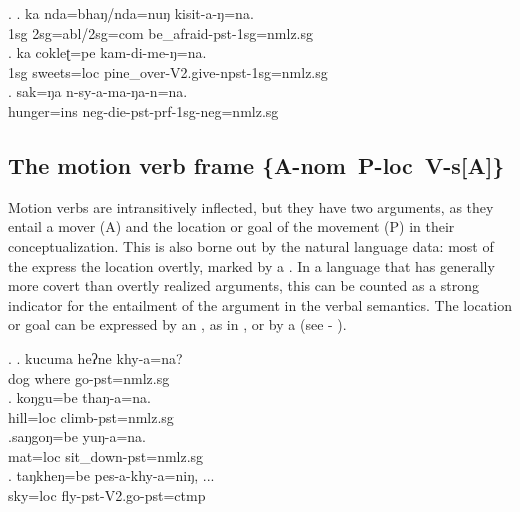 \ex. \ag.  ka nda=bhaŋ/nda=nuŋ kisit-a-ŋ=na.\\
	{\sc 1sg} {\sc 2sg=abl/2sg=com} be\_afraid-{\sc pst-1sg=nmlz.sg}\\
\bg. ka cokleʈ=pe kam-di-me-ŋ=na.\\
	{\sc 1sg} sweets{\sc =loc} pine\_over-{\sc V2.give-npst-1sg=nmlz.sg}\\
\bg. sak=ŋa n-sy-a-ma-ŋa-n=na.\\
			hunger{\sc =ins} {\sc neg-}die{\sc -pst-prf-1sg-neg=nmlz.sg}\\
				
\subsection[The motion verb frame]{The motion verb frame %
\mbox{\{A-{\sc nom} P-{\sc loc} V-s[A]\}}}
\label{itr-motion}
 
\noindent 
Motion verbs are intransitively inflected, but they have two arguments, as they entail a mover (A) and the location or goal of the movement (P) in their conceptualization. This is also borne out by the natural language data: most of the  express the location overtly, marked by a . In a language that has generally more covert than overtly realized arguments, this can be counted as a strong indicator for the entailment of the  argument in the verbal semantics. The location or goal can be expressed by an , as in \Next[a], or by a  (see \Next[b] - \Next[d]). 

\ex. \ag. kucuma heʔne khy-a=na?\\
		dog where go{\sc [3sg]-pst=nmlz.sg} 	\\
	\bg. koŋgu=be thaŋ-a=na.\\
		hill{\sc =loc} climb{\sc [3sg]-pst=nmlz.sg}\\
	\bg.saŋgoŋ=be yuŋ-a=na.\\
	 mat{\sc =loc} sit\_down{\sc [3sg]-pst=nmlz.sg}\\
	\bg.  taŋkheŋ=be  pes-a-khy-a=niŋ, ...\\
	 sky{\sc =loc} fly{\sc [3sg]-pst-V2.go-pst=ctmp}		\\
	 	


